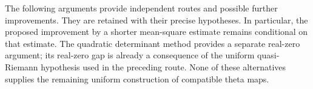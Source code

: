 The following arguments provide independent routes and possible further
improvements.  They are retained with their precise hypotheses.  In
particular, the proposed improvement by a shorter mean-square estimate
remains conditional on that estimate.  The quadratic determinant method
provides a separate real-zero argument; its real-zero gap is already a
consequence of the uniform quasi-Riemann hypothesis used in the preceding
route.  None of these alternatives supplies the remaining uniform
construction of compatible theta maps.
















\clearpage


